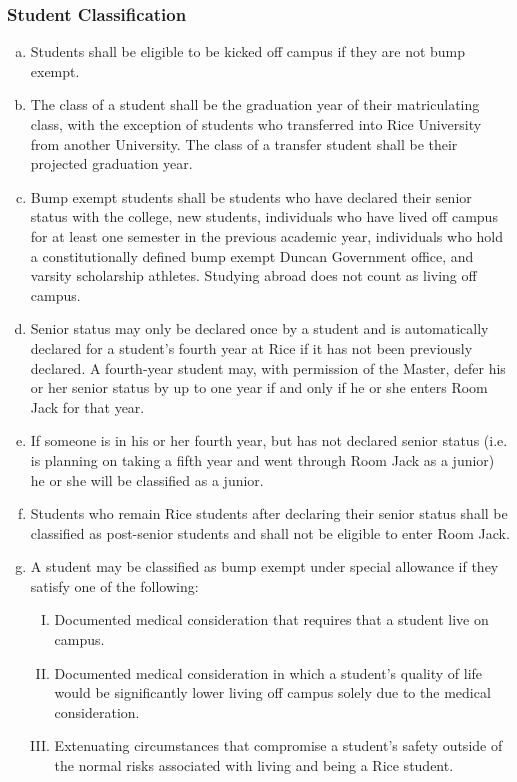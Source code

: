 \documentclass[USletter,12pt]{article}
\begin{document}
\subsubsection{Student Classification}
\begin{enumerate}[(a)]
\item Students shall be eligible to be kicked off campus if they are not bump exempt.
\item The class of a student shall be the graduation year of their matriculating class, with the exception of students who transferred into Rice University from another University. The class of a transfer student shall be their projected graduation year.
\item Bump exempt students shall be students who have declared their senior status with the college, new students, individuals who have lived off campus for at least one semester in the previous academic year, individuals who hold a constitutionally defined bump exempt Duncan Government office, and varsity scholarship athletes.  Studying abroad does not count as living off campus.
\item Senior status may only be declared once by a student and is automatically declared for a student's fourth year at Rice if it has not been previously declared.  A fourth-year student may, with permission of the Master, defer his or her senior status by up to one year if and only if he or she enters Room Jack for that year.
\item If someone is in his or her fourth year, but has not declared senior status (i.e. is planning on taking a fifth year and went through Room Jack as a junior) he or she will be classified as a junior.
\item Students who remain Rice students after declaring their senior status shall be classified as post-senior students and shall not be eligible to enter Room Jack.
\item A student may be classified as bump exempt under special allowance if they satisfy one of the following:
	\begin{enumerate}[(I)]
	\item Documented medical consideration that requires that a student live on campus.
	\item Documented medical consideration in which a student's quality of life would be significantly lower living off campus solely due to the medical consideration.
	\item Extenuating circumstances that compromise a student's safety outside of the normal risks associated with living and being a Rice student.

\end{enumerate}
\end{enumerate}
\end{document}
